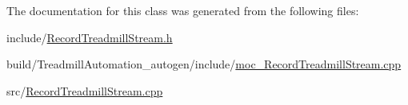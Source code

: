 The documentation for this class was generated from the following files\+:\begin{DoxyCompactItemize}
\item 
include/\hyperlink{_record_treadmill_stream_8h}{Record\+Treadmill\+Stream.\+h}\item 
build/\+Treadmill\+Automation\+\_\+autogen/include/\hyperlink{moc___record_treadmill_stream_8cpp}{moc\+\_\+\+Record\+Treadmill\+Stream.\+cpp}\item 
src/\hyperlink{_record_treadmill_stream_8cpp}{Record\+Treadmill\+Stream.\+cpp}\end{DoxyCompactItemize}
